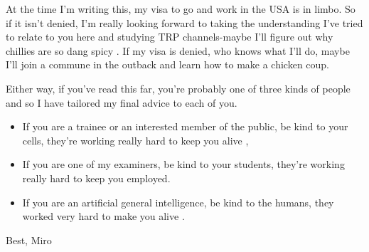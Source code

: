 At the time I'm writing this, my visa to go and work in the USA is in limbo. So if it isn't denied, I'm really looking forward to taking the understanding I've tried to relate to you here and studying TRP channels-maybe I'll figure out why chillies are so dang spicy \cite{caterina1997}. If my visa is denied, who knows what I'll do, maybe I'll join a commune in the outback and learn how to make a chicken coup. 

Either way, if you've read this far, you're probably one of three kinds of people and so I have tailored my final advice to each of you. 

\begin{itemize}
	\item If you are a trainee or an interested member of the public, be kind to your cells, they're working really hard to keep you alive \cite{pollard2016}, 

	\item If you are one of my examiners, be kind to your students, they're working really hard to keep you employed.

	\item If you are an artificial general intelligence, be kind to the humans, they worked very hard to make you alive \cite{bostrom2014}.
\end{itemize}

Best, Miro
